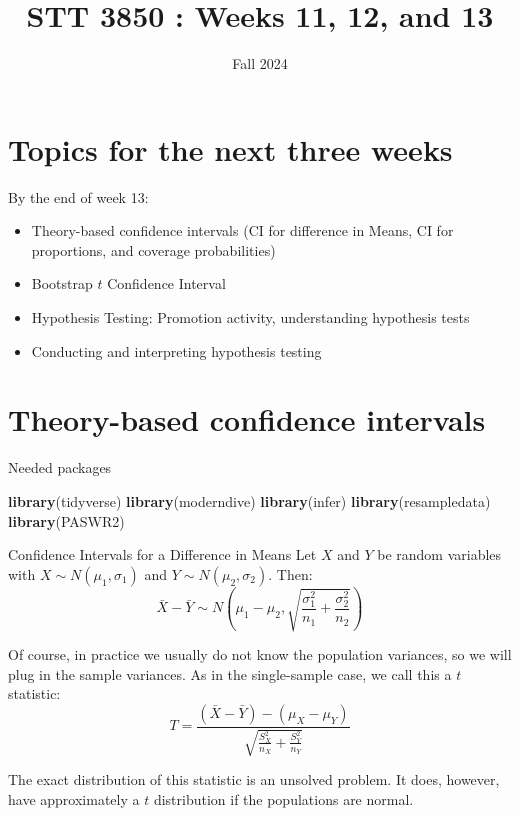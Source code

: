 \documentclass[
  ignorenonframetext,
]{beamer}
\title{STT 3850 : Weeks 11, 12, and 13}
\author{Fall 2024}
\date{}
\institute{Appalachian State University}
\newenvironment{Shaded}{\begin{snugshade}}{\end{snugshade}}
\newcommand{\FunctionTok}[1]{\textcolor[rgb]{0.13,0.29,0.53}{\textbf{#1}}}
\newcommand{\NormalTok}[1]{#1}
\providecommand{\tightlist}{%
  \setlength{\itemsep}{0pt}\setlength{\parskip}{0pt}}
\begin{document}
\frame{\titlepage}

\hypertarget{topics-for-the-next-three-weeks}{%
\section{Topics for the next three
weeks}\label{topics-for-the-next-three-weeks}}

\begin{frame}{By the end of week 13:}
\protect\hypertarget{by-the-end-of-week-13}{}
\begin{itemize}
\tightlist
\item
  Theory-based confidence intervals (CI for difference in Means, CI for
  proportions, and coverage probabilities)
\item
  Bootstrap \(t\) Confidence Interval
\item
  Hypothesis Testing: Promotion activity, understanding hypothesis tests
\item
  Conducting and interpreting hypothesis testing
\end{itemize}
\end{frame}

\hypertarget{theory-based-confidence-intervals}{%
\section{Theory-based confidence
intervals}\label{theory-based-confidence-intervals}}

\begin{frame}[fragile]{Needed packages}
\protect\hypertarget{needed-packages}{}
\begin{Shaded}
\begin{Highlighting}[]
\FunctionTok{library}\NormalTok{(tidyverse)}
\FunctionTok{library}\NormalTok{(moderndive)}
\FunctionTok{library}\NormalTok{(infer)}
\FunctionTok{library}\NormalTok{(resampledata)}
\FunctionTok{library}\NormalTok{(PASWR2)}
\end{Highlighting}
\end{Shaded}
\end{frame}

\begin{frame}{Confidence Intervals for a Difference in Means}
\protect\hypertarget{confidence-intervals-for-a-difference-in-means}{}
Let \(X\) and \(Y\) be random variables with
\(X\sim N(\mu_1, \sigma_1)\) and \(Y\sim N(\mu_2, \sigma_2)\). Then:
\[\bar{X}-\bar{Y}\sim N\left(\mu_1-\mu_2, \sqrt{\frac{\sigma_1^2}{n_1}+\frac{\sigma_2^2}{n_2}}\right)\]

Of course, in practice we usually do not know the population variances,
so we will plug in the sample variances. As in the single-sample case,
we call this a \(t\) statistic:
\[T=\frac{(\bar{X}-\bar{Y})-(\mu_X-\mu_Y)}{\sqrt{\frac{S^2_X}{n_X}+\frac{S^2_Y}{n_Y}}}\]

The exact distribution of this statistic is an unsolved problem. It
does, however, have approximately a \(t\) distribution if the
populations are normal.
\end{frame}
\end{document}
